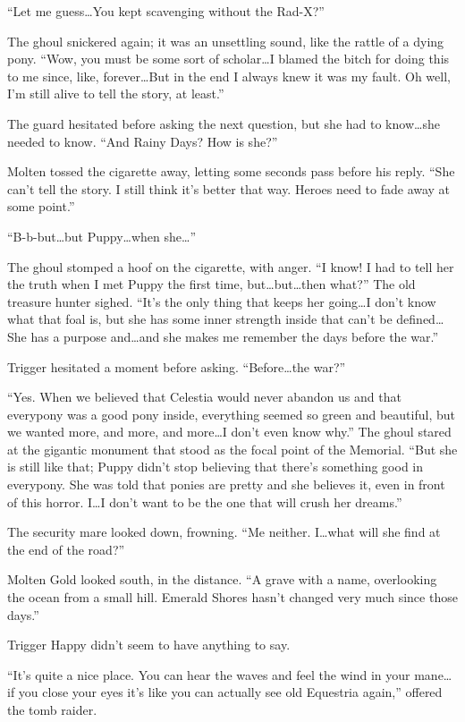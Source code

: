 ``Let me guess\dots You kept scavenging without the Rad-X?''

The ghoul snickered again; it was an unsettling sound, like the rattle of a dying pony. ``Wow, you must be some sort of scholar\dots I blamed the bitch for doing this to me since, like, forever\dots But in the end I always knew it was my fault. Oh well, I'm still alive to tell the story, at least.''

The guard hesitated before asking the next question, but she had to know\dots she needed to know. ``And Rainy Days? How is she?''

Molten tossed the cigarette away, letting some seconds pass before his reply. ``She can't tell the story. I still think it's better that way. Heroes need to fade away at some point.''

``B-b-but\dots but Puppy\dots when she\dots''

The ghoul stomped a hoof on the cigarette, with anger. ``I know! I had to tell her the truth when I met Puppy the first time, but\dots but\dots then what?'' The old treasure hunter sighed. ``It's the only thing that keeps her going\dots I don't know what that foal is, but she has some inner strength inside that can't be defined\dots She has a purpose and\dots and she makes me remember the days before the war.''

Trigger hesitated a moment before asking. ``Before\dots the war?''

``Yes. When we believed that Celestia would never abandon us and that everypony was a good pony inside, everything seemed so green and beautiful, but we wanted more, and more, and more\dots I don't even know why.'' The ghoul stared at the gigantic monument that stood as the focal point of the Memorial. ``But she is still like that; Puppy didn't stop believing that there's something good in everypony. She was told that ponies are pretty and she believes it, even in front of this horror. I\dots I don't want to be the one that will crush her dreams.''

The security mare looked down, frowning. ``Me neither. I\dots what will she find at the end of the road?''

Molten Gold looked south, in the distance. ``A grave with a name, overlooking the ocean from a small hill. Emerald Shores hasn't changed very much since those days.''

Trigger Happy didn't seem to have anything to say.

``It's quite a nice place. You can hear the waves and feel the wind in your mane\dots if you close your eyes it's like you can actually see old Equestria again,'' offered the tomb raider.

